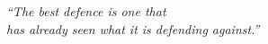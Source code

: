 \thispagestyle{empty}
\vspace*{\fill}
\begin{flushright}
  \itshape\large
  ``The best defence is one that\\
  has already seen what it is defending against.''
\end{flushright}
\vspace*{\fill}
\cleardoublepage
